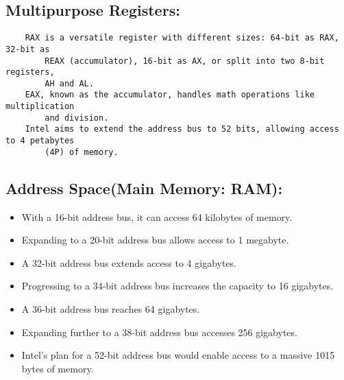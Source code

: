 \documentclass{article}
\begin{document}
\subsection*{Multipurpose Registers:}
\begin{verbatim}
    RAX is a versatile register with different sizes: 64-bit as RAX, 32-bit as 
        REAX (accumulator), 16-bit as AX, or split into two 8-bit registers,
        AH and AL.
    EAX, known as the accumulator, handles math operations like multiplication
        and division.
    Intel aims to extend the address bus to 52 bits, allowing access to 4 petabytes
        (4P) of memory.
\end{verbatim}

\newpage
\subsection*{Address Space(Main Memory: RAM):}

\begin{itemize}
    \item With a 16-bit address bus, it can access 64 kilobytes of memory.
    \item Expanding to a 20-bit address bus allows access to 1 megabyte.
    \item A 32-bit address bus extends access to 4 gigabytes.
    \item Progressing to a 34-bit address bus increases the capacity to 16 gigabytes.
    \item A 36-bit address bus reaches 64 gigabytes.
    \item Expanding further to a 38-bit address bus accesses 256 gigabytes.
    \item Intel's plan for a 52-bit address bus would enable access to a massive 1015 bytes of memory.
\end{itemize}
\end{document}
